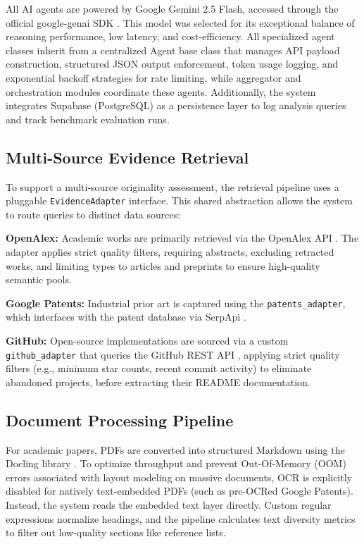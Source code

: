 All AI agents are powered by Google Gemini 2.5 Flash, accessed through the official google-genai SDK \citep{geminiAPI}. This model was selected for its exceptional balance of reasoning performance, low latency, and cost-efficiency. All specialized agent classes inherit from a centralized Agent base class that manages API payload construction, structured JSON output enforcement, token usage logging, and exponential backoff strategies for rate limiting, while aggregator and orchestration modules coordinate these agents. Additionally, the system integrates Supabase (PostgreSQL) as a persistence layer to log analysis queries and track benchmark evaluation runs.

\subsection{Multi-Source Evidence Retrieval}

To support a multi-source originality assessment, the retrieval pipeline uses a pluggable \texttt{EvidenceAdapter} interface. This shared abstraction allows the system to route queries to distinct data sources:

\textbf{OpenAlex:} Academic works are primarily retrieved via the OpenAlex API \citep{openalexDocs}. The adapter applies strict quality filters, requiring abstracts, excluding retracted works, and limiting types to articles and preprints to ensure high-quality semantic pools.

\textbf{Google Patents:} Industrial prior art is captured using the \texttt{patents\_adapter}, which interfaces with the patent database via SerpApi \citep{serpapi}.

\textbf{GitHub:} Open-source implementations are sourced via a custom \texttt{github\_adapter} that queries the GitHub REST API \citep{githubAPI}, applying strict quality filters (e.g., minimum star counts, recent commit activity) to eliminate abandoned projects, before extracting their README documentation.

\subsection{Document Processing Pipeline}

For academic papers, PDFs are converted into structured Markdown using the Docling library \citep{docling}. To optimize throughput and prevent Out-Of-Memory (OOM) errors associated with layout modeling on massive documents, OCR is explicitly disabled for natively text-embedded PDFs (such as pre-OCRed Google Patents). Instead, the system reads the embedded text layer directly. Custom regular expressions normalize headings, and the pipeline calculates text diversity metrics to filter out low-quality sections like reference lists.

